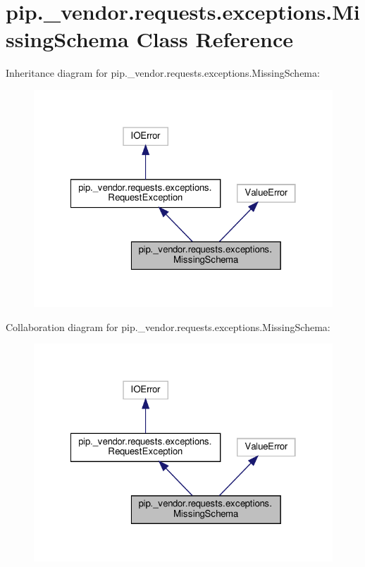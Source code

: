 \hypertarget{classpip_1_1__vendor_1_1requests_1_1exceptions_1_1MissingSchema}{}\section{pip.\+\_\+vendor.\+requests.\+exceptions.\+Missing\+Schema Class Reference}
\label{classpip_1_1__vendor_1_1requests_1_1exceptions_1_1MissingSchema}


Inheritance diagram for pip.\+\_\+vendor.\+requests.\+exceptions.\+Missing\+Schema\+:
\nopagebreak
\begin{figure}[H]
\begin{center}
\leavevmode
\includegraphics[width=322pt]{classpip_1_1__vendor_1_1requests_1_1exceptions_1_1MissingSchema__inherit__graph}
\end{center}
\end{figure}


Collaboration diagram for pip.\+\_\+vendor.\+requests.\+exceptions.\+Missing\+Schema\+:
\nopagebreak
\begin{figure}[H]
\begin{center}
\leavevmode
\includegraphics[width=322pt]{classpip_1_1__vendor_1_1requests_1_1exceptions_1_1MissingSchema__coll__graph}
\end{center}
\end{figure}
